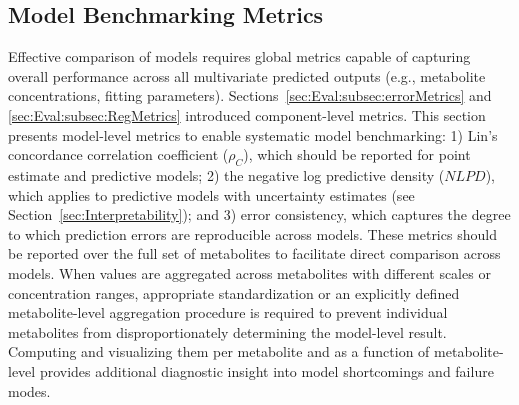 \subsection{Model Benchmarking Metrics}
\label{sec:Eval:subsec:benchmarking}
Effective comparison of models requires global metrics capable of capturing overall performance across all multivariate predicted outputs (e.g., metabolite concentrations, fitting parameters). Sections~\ref{sec:Eval:subsec:errorMetrics} and \ref{sec:Eval:subsec:RegMetrics} introduced component-level metrics. This section presents model-level metrics to enable systematic model benchmarking: 1) Lin's concordance correlation coefficient \cite{Lin1989} ($\rho_C$), which should be reported for point estimate and predictive models; 2) the negative log predictive density ($NLPD$), which applies to predictive models with uncertainty estimates (see Section~\ref{sec:Interpretability}); and 3) error consistency, which captures the degree to which prediction errors are reproducible across models. These metrics should be reported over the full set of metabolites to facilitate direct comparison across models. When values are aggregated across metabolites with different scales or concentration ranges, appropriate standardization or an explicitly defined metabolite-level aggregation procedure is required to prevent individual metabolites from disproportionately determining the model-level result. Computing and visualizing them per metabolite and as a function of metabolite-level \SNR provides additional diagnostic insight into model shortcomings and failure modes.

